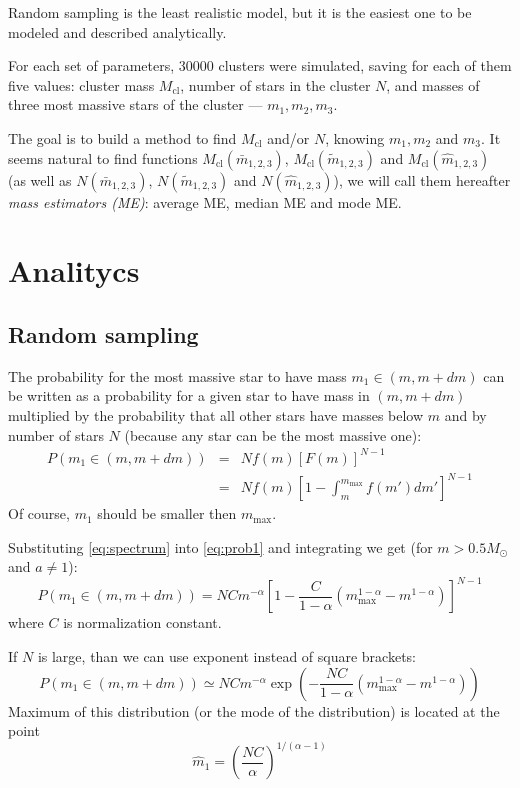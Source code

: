 \documentclass[a4paper,10pt]{article}
\newcommand{\MSun}{M_\odot}
\newcommand{\Mmax}{m_{\mathrm{max}}}
\newcommand{\Mcl}{M_{\mathrm{cl}}}
\begin{document}
Random sampling is the least realistic model, but it is the easiest one to be modeled and described analytically.

For each set of parameters, 30000 clusters were simulated, saving for each of them five values: cluster mass $\Mcl$,
number of stars in the cluster $N$, and masses of three most massive stars of the cluster --- $m_1, m_2, m_3$.

The goal is to build a method to find $\Mcl$ and/or $N$, knowing $m_1, m_2$ and $m_3$.
It seems natural to find functions $\Mcl(\bar{m}_{1,2,3})$, $\Mcl(\tilde{m}_{1,2,3})$ and $\Mcl(\hat{m}_{1,2,3})$ (as well as $N(\bar{m}_{1,2,3})$, $N(\tilde{m}_{1,2,3})$ and $N(\hat{m}_{1,2,3})$), we will call them hereafter \textit{mass estimators (ME)}: average ME, median ME and mode ME. 


\section{Analitycs}
\subsection*{Random sampling}
The probability for the most massive star to have mass $m_1 \in (m, m+dm)$ can be written as a probability for a given star to have mass in $(m, m+dm)$ multiplied by the probability that all other stars have masses below $m$ and by number of stars $N$ (because any star can be the most massive one):
\begin{eqnarray}
 P(m_1 \in (m, m+dm)) &=& N f(m) \left[ F(m) \right]^{N-1} \nonumber \\ 
    &=& N f(m) \left[ 1 - \int_m^{\Mmax} f(m')dm' \right]^{N-1} \label{eq:prob1}
\end{eqnarray} 
Of course, $m_1$ should be smaller then $\Mmax$.

Substituting \ref{eq:spectrum} into \ref{eq:prob1} and integrating we get (for $m > 0.5 \MSun$ and $a \neq 1$):
\begin{equation}
  P(m_1 \in (m, m+dm)) = N C m^{-\alpha} \left[ 1 - \frac{C}{1-\alpha} \left( \Mmax^{1-\alpha} - m^{1-\alpha} \right) \right]^{N-1} 
\end{equation} 
where $C$ is normalization constant.

If $N$ is large, than we can use exponent instead of square brackets:
\begin{equation} \label{eq:p_1st}
 P(m_1 \in (m, m+dm)) \simeq N C m^{-\alpha} \exp \left( -\frac{N C}{1-\alpha} \left( \Mmax^{1-\alpha} - m^{1-\alpha} \right)\right)
\end{equation} 
Maximum of this distribution (or the mode of the distribution) is located at the point
\begin{equation}
 \hat{m}_1 = \left(\frac{NC}{\alpha}\right)^{1/(\alpha-1)}
\end{equation} 
\end{document}
